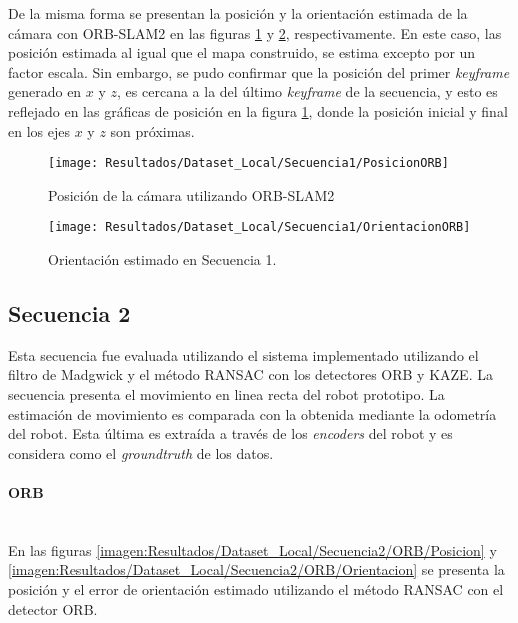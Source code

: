 De la misma forma se presentan la posición y la orientación estimada de la cámara con ORB-SLAM2 en las figuras \ref{imagen:Resultados/Dataset_Local/Secuencia3/PosicionORB} y \ref{imagen:Resultados/Dataset_Local/Secuencia1/OrientacionORB}, respectivamente. En este caso, las posición estimada al igual que el mapa construido, se estima excepto por un factor escala. Sin embargo, se pudo confirmar que la posición del primer \textit{keyframe} generado en $x$ y $z$, es cercana a la del último \textit{keyframe} de la secuencia, y esto es reflejado en las gráficas de posición en la figura \ref{imagen:Resultados/Dataset_Local/Secuencia3/PosicionORB}, donde la posición inicial y final en los ejes $x$ y $z$ son próximas.


\begin{figure}[H]
	\centering
	\texttt{[image: Resultados/Dataset\_Local/Secuencia1/PosicionORB]}
	\caption{Posición de la cámara utilizando ORB-SLAM2}
	\label{imagen:Resultados/Dataset_Local/Secuencia3/PosicionORB}
\end{figure}


\begin{figure}[H]
	\centering
	\texttt{[image: Resultados/Dataset\_Local/Secuencia1/OrientacionORB]}
	\caption[Orientación estimada en Secuencia 1 utilizando ORB-SLAM2]{Orientación estimado en Secuencia 1.}
	\label{imagen:Resultados/Dataset_Local/Secuencia1/OrientacionORB}
\end{figure}

\subsection{Secuencia 2}

Esta secuencia fue evaluada utilizando el sistema implementado utilizando el filtro de Madgwick y el método RANSAC con los detectores ORB y KAZE. La secuencia presenta el movimiento en linea recta del robot prototipo. La estimación de movimiento es comparada con la obtenida mediante la odometría del robot. Esta última es extraída a través de los \textit{encoders} del robot y es considera como el \textit{groundtruth} de los datos.

\paragraph{ORB \\ \\}

En las figuras \ref{imagen:Resultados/Dataset_Local/Secuencia2/ORB/Posicion} y \ref{imagen:Resultados/Dataset_Local/Secuencia2/ORB/Orientacion} se presenta la posición y el error de orientación estimado utilizando el método RANSAC con el detector ORB. 

